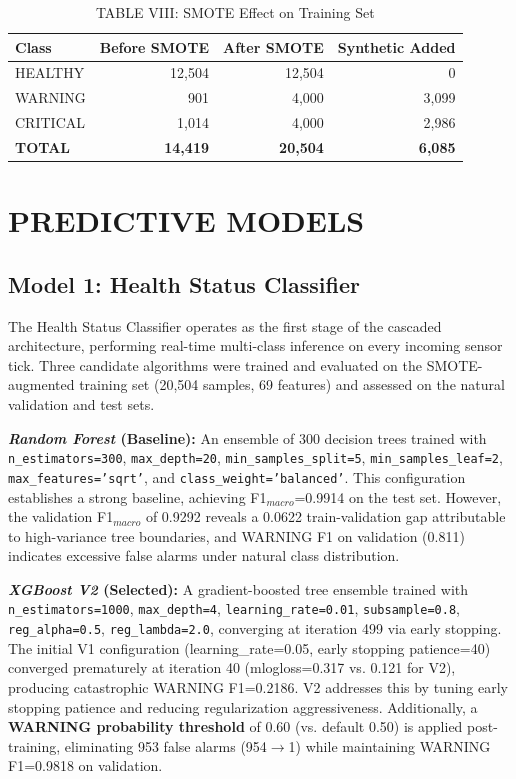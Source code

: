 \documentclass[conference]{IEEEtran}
\begin{document}
\begin{table}[htbp]
\caption{TABLE VIII: SMOTE Effect on Training Set}
\centering
\begin{tabular}{lrrr}
\hline
\textbf{Class} & \textbf{Before SMOTE} & \textbf{After SMOTE} & \textbf{Synthetic Added} \\
\hline
HEALTHY & 12,504 & 12,504 & 0 \\
WARNING & 901 & 4,000 & 3,099 \\
CRITICAL & 1,014 & 4,000 & 2,986 \\
\hline
\textbf{TOTAL} & \textbf{14,419} & \textbf{20,504} & \textbf{6,085} \\
\hline
\end{tabular}
\label{tab:smote}
\end{table}

\section{PREDICTIVE MODELS}

\subsection{Model 1: Health Status Classifier}

The Health Status Classifier operates as the first stage of the cascaded architecture, performing real-time multi-class inference on every incoming sensor tick. Three candidate algorithms were trained and evaluated on the SMOTE-augmented training set (20,504 samples, 69 features) and assessed on the natural validation and test sets.

\textbf{\textit{Random Forest} (Baseline):} An ensemble of 300 decision trees trained with \texttt{n\_estimators=300}, \texttt{max\_depth=20}, \texttt{min\_samples\_split=5}, \texttt{min\_samples\_leaf=2}, \texttt{max\_features='sqrt'}, and \texttt{class\_weight='balanced'}. This configuration establishes a strong baseline, achieving F1$_{macro}$=0.9914 on the test set. However, the validation F1$_{macro}$ of 0.9292 reveals a 0.0622 train-validation gap attributable to high-variance tree boundaries, and WARNING F1 on validation (0.811) indicates excessive false alarms under natural class distribution.

\textbf{\textit{XGBoost V2} (Selected):} A gradient-boosted tree ensemble trained with \texttt{n\_estimators=1000}, \texttt{max\_depth=4}, \texttt{learning\_rate=0.01}, \texttt{subsample=0.8}, \texttt{reg\_alpha=0.5}, \texttt{reg\_lambda=2.0}, converging at iteration 499 via early stopping. The initial V1 configuration (learning\_rate=0.05, early stopping patience=40) converged prematurely at iteration 40 (mlogloss=0.317 vs. 0.121 for V2), producing catastrophic WARNING F1=0.2186. V2 addresses this by tuning early stopping patience and reducing regularization aggressiveness. Additionally, a \textbf{WARNING probability threshold} of 0.60 (vs. default 0.50) is applied post-training, eliminating 953 false alarms (954$\rightarrow$1) while maintaining WARNING F1=0.9818 on validation.
\end{document}
